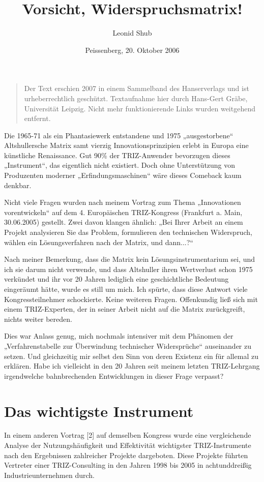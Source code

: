 \documentclass[11pt,a4paper]{article}
\title{Vorsicht, Widerspruchsmatrix!}
\author{Leonid Shub}
\date{Peissenberg, 20. Oktober 2006}
\begin{document}
\maketitle

\begin{quote}
  Der Text erschien 2007 in einem Sammelband des Hanserverlags und ist
  urheberrechtlich geschützt.  Textaufnahme hier durch Hans-Gert Gräbe,
  Universität Leipzig. Nicht mehr funktionierende Links wurden weitgehend
  entfernt. 
\end{quote}
  
Die 1965-71 als ein Phantasiewerk entstandene und 1975 „ausgestorbene“
Altshullersche Matrix samt vierzig Innovationsprinzipien erlebt in Europa eine
künstliche Renaissance.  Gut 90\% der TRIZ-Anwender bevorzugen dieses
„Instrument“, das eigentlich nicht existiert. Doch ohne Unterstützung von
Produzenten moderner „Erfindungsmaschinen“ wäre dieses Comeback kaum denkbar.

Nicht viele Fragen wurden nach meinem Vortrag zum Thema „Innovationen
vorentwickeln“ auf dem 4. Europäischen TRIZ-Kongress (Frankfurt a. Main,
30.06.2005) gestellt. Zwei davon klangen ähnlich: „Bei Ihrer Arbeit an einem
Projekt analysieren Sie das Problem, formulieren den technischen Widerspruch,
wählen ein Lösungsverfahren nach der Matrix, und dann...?“

Nach meiner Bemerkung, dass die Matrix kein Lösungsinstrumentarium sei, und
ich sie darum nicht verwende, und dass Altshuller ihren Wertverlust schon 1975
verkündet und ihr vor 20 Jahren lediglich eine geschichtliche Bedeutung
eingeräumt hätte, wurde es still um mich. Ich spürte, dass diese Antwort viele
Kongressteilnehmer schockierte. Keine weiteren Fragen. Offenkundig ließ sich
mit einem TRIZ-Experten, der in seiner Arbeit nicht auf die Matrix
zurückgreift, nichts weiter bereden.

Dies war Anlass genug, mich nochmals intensiver mit dem Phänomen der
„Verfahrenstabelle zur Überwindung technischer Widersprüche“ auseinander zu
setzen. Und gleichzeitig mir selbst den Sinn von deren Existenz ein für
allemal zu erklären. Habe ich vielleicht in den 20 Jahren seit meinem letzten
TRIZ-Lehrgang irgendwelche bahnbrechenden Entwicklungen in dieser Frage
verpasst?

\section*{Das wichtigste Instrument}
In einem anderen Vortrag [2] auf demselben Kongress wurde eine vergleichende
Analyse der Nutzungshäufigkeit und Effektivität wichtigster TRIZ-Instrumente
nach den Ergebnissen zahlreicher Projekte dargeboten. Diese Projekte führten
Vertreter einer TRIZ-Consulting in den Jahren 1998 bis 2005 in achtunddreißig
Industrieunternehmen durch.
\end{document}
